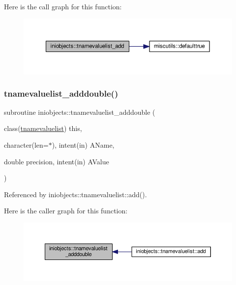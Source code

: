 Here is the call graph for this function\+:
\nopagebreak
\begin{figure}[H]
\begin{center}
\leavevmode
\includegraphics[width=350pt]{namespaceiniobjects_a0bf091b688bae891c20047d3b5bfca2a_cgraph}
\end{center}
\end{figure}
\mbox{\label{namespaceiniobjects_a8214934f23a7801b7ec3c3f6da452aac}} 
\subsubsection{\texorpdfstring{tnamevaluelist\+\_\+adddouble()}{tnamevaluelist\_adddouble()}}
{\footnotesize\ttfamily subroutine iniobjects\+::tnamevaluelist\+\_\+adddouble (\begin{DoxyParamCaption}\item[{class(\mbox{\hyperlink{structiniobjects_1_1tnamevaluelist}{tnamevaluelist}})}]{this,  }\item[{character(len=$\ast$), intent(in)}]{A\+Name,  }\item[{double precision, intent(in)}]{A\+Value }\end{DoxyParamCaption})\hspace{0.3cm}{\ttfamily [private]}}



Referenced by iniobjects\+::tnamevaluelist\+::add().

Here is the caller graph for this function\+:
\nopagebreak
\begin{figure}[H]
\begin{center}
\leavevmode
\includegraphics[width=350pt]{namespaceiniobjects_a8214934f23a7801b7ec3c3f6da452aac_icgraph}
\end{center}
\end{figure}
\mbox{\label{namespaceiniobjects_a4c60c5afba93a368d2e832c9adbf6964}} 
